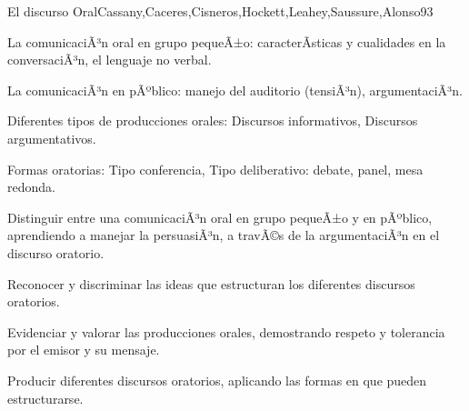 \begin{syllabus}
\begin{unit}{El discurso Oral}{Cassany,Caceres,Cisneros,Hockett,Leahey,Saussure,Alonso}{9}{3}
\begin{topics}
   \item La comunicaciÃ³n oral en grupo pequeÃ±o: caracterÃ­sticas y cualidades en la conversaciÃ³n, el lenguaje no  verbal.
   \item La comunicaciÃ³n en pÃºblico: manejo del auditorio (tensiÃ³n), argumentaciÃ³n.
   \item Diferentes tipos de producciones orales: Discursos informativos, Discursos argumentativos.
   \item Formas oratorias: Tipo conferencia, Tipo deliberativo: debate, panel, mesa redonda.
\end{topics}
\begin{unitgoals}
   \item Distinguir entre una comunicaciÃ³n oral en grupo pequeÃ±o y en pÃºblico, aprendiendo a manejar la persuasiÃ³n, a travÃ©s de la argumentaciÃ³n en el discurso oratorio.
   \item Reconocer y discriminar las ideas que estructuran los diferentes discursos oratorios.
   \item Evidenciar y valorar las producciones orales, demostrando respeto y tolerancia por el emisor y su mensaje.
   \item Producir diferentes discursos oratorios, aplicando las formas en que pueden estructurarse.
\end{unitgoals}
\end{unit}



\begin{coursebibliography}
\end{coursebibliography}

\end{syllabus}

